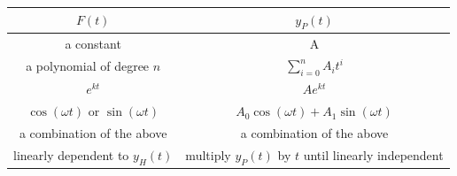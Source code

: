 \documentclass{article}
\begin{document}
\begin{table}[H]
    \centering
    \begin{tabular}{c c}
        \toprule
        \(F(t)\)                                                             & \(y_P(t)\)                                                                \\
        \midrule
        a constant                                                         & A                                                                       \\
        a polynomial of degree \(n\)                                         & \(\displaystyle \sum_{i = 0}^n A_i t^i\)                                  \\
        \(e^{kt}\)                                                          & \(A e^{kt}\)                                                             \\
        \(\cos{\left( \omega t \right)}\) or \(\sin{\left( \omega t \right)}\) & \(A_0 \cos{\left( \omega t \right)} + A_1 \sin{\left( \omega t \right)}\) \\
        a combination of the above                                         & a combination of the above                                              \\
        linearly dependent to \(y_H(t)\)                                     & multiply \(y_P(t)\) by \(t\) until linearly independent                     \\
        \bottomrule
    \end{tabular}
\end{table}
\end{document}
